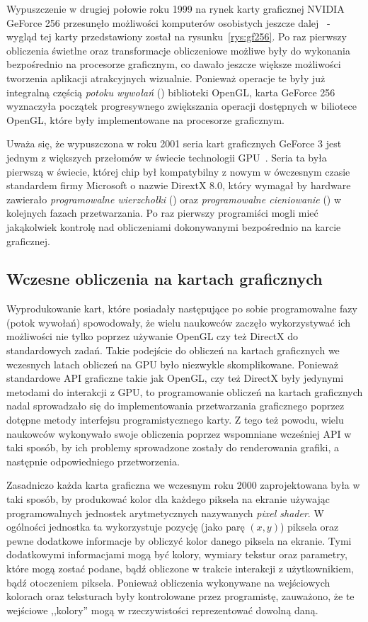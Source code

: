 Wypuszczenie w drugiej połowie roku 1999 na rynek karty graficznej NVIDIA GeForce 256 przesunęło możliwości komputerów osobistych jeszcze dalej~\cite{nvidia:geforce256} - wygląd tej karty przedstawiony został na rysunku~\ref{rys:gf256}. Po raz pierwszy obliczenia świetlne oraz transformacje obliczeniowe możliwe były do wykonania bezpośrednio na procesorze graficznym, co dawało jeszcze większe możliwości tworzenia aplikacji atrakcyjnych wizualnie. Ponieważ operacje te były już integralną częścią \emph{potoku wywołań} () biblioteki OpenGL, karta GeForce 256 wyznaczyła początek progresywnego zwiększania operacji dostępnych w biliotece OpenGL, które były implementowane na procesorze graficznym.

Uważa się, że wypuszczona w roku 2001 seria kart graficznych GeForce 3 jest jednym z większych przełomów w świecie technologii GPU~\cite{nvidia:geforce3,Cuda:Example}. Seria ta była pierwszą w świecie, której chip był kompatybilny z nowym w ówczesnym czasie standardem firmy Microsoft o nazwie DirextX 8.0, który wymagał by hardware zawierało \emph{programowalne wierzchołki} () oraz \emph{programowalne cieniowanie} () w kolejnych fazach przetwarzania. Po raz pierwszy programiści mogli mieć jakąkolwiek kontrolę nad obliczeniami dokonywanymi bezpośrednio na karcie graficznej.

\subsection{Wczesne obliczenia na kartach graficznych}

Wyprodukowanie kart, które posiadały następujące po sobie programowalne fazy (potok wywołań) spowodowały, że wielu naukowców zaczęło wykorzystywać ich możliwości nie tylko poprzez używanie OpenGL czy też DirectX do standardowych zadań. Takie podejście do obliczeń na kartach graficznych we wczesnych latach obliczeń na GPU było niezwykle skomplikowane. Ponieważ standardowe API graficzne takie jak OpenGL, czy też DirectX były jedynymi metodami do interakcji z GPU, to programowanie obliczeń na kartach graficznych nadal sprowadzało się do implementowania przetwarzania graficznego poprzez dotępne metody interfejsu programistycznego karty. Z tego też powodu, wielu naukowców wykonywało swoje obliczenia poprzez wspomniane wcześniej API w taki sposób, by ich problemy sprowadzone zostały do renderowania grafiki, a następnie odpowiedniego przetworzenia.

Zasadniczo każda karta graficzna we wczesnym roku 2000 zaprojektowana była w taki sposób, by produkować kolor dla każdego piksela na ekranie używając programowalnych jednostek arytmetycznych nazywanych \emph{pixel shader}. W ogólności jednostka ta wykorzystuje pozycję (jako parę $(x, y)$) piksela oraz pewne dodatkowe informacje by obliczyć kolor danego piksela na ekranie. Tymi dodatkowymi informacjami mogą być kolory, wymiary tekstur oraz parametry, które mogą zostać podane, bądź obliczone w trakcie interakcji z użytkownikiem, bądź otoczeniem piksela. Ponieważ obliczenia wykonywane na wejściowych kolorach oraz teksturach były kontrolowane przez programistę, zauważono, że te wejściowe ,,kolory'' mogą w rzeczywistości reprezentować dowolną daną.

